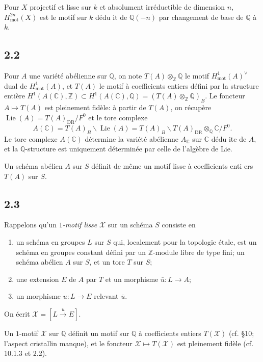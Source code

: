 \documentclass[12pt,a4paper]{article}
\theoremstyle{plain}
\theoremstyle{definition}
\theoremstyle{remark}
\DeclareMathOperator{\Lie}{Lie}
\newcommand{\mot}{\mathrm{mot}}
\providecommand{\mot}{\mathrm{mot}}
\providecommand{\DR}{\mathrm{DR}}
\providecommand{\Lie}{\operatorname{Lie}}
\begin{document}
Pour $X$ projectif et lisse sur $k$ et absolument irr\'eductible de dimension $n$,
$H^{2n}_\mot(X)$ est le motif sur $k$ d\'edu it de $\mathbb{Q}(-n)$ par changement de
base de $\mathbb{Q}$ \`a $k$.

\subsection*{2.2}

Pour $A$ une vari\'et\'e ab\'elienne sur $\mathbb{Q}$, on note $T(A) \otimes_{\mathbb{Z}}
\mathbb{Q}$ le motif $H^1_\mot(A)^\vee$ dual de $H^1_\mot(A)$, et $T(A)$ le motif \`a
coefficients entiers d\'efini par la structure enti\`ere $H^1(A(\mathbb{C}), \mathbb{Z}) \subset
H^1(A(\mathbb{C}), \mathbb{Q}) = (T(A) \otimes_{\mathbb{Z}} \mathbb{Q})_B$. Le foncteur
$A \mapsto T(A)$ est pleinement fid\`ele: \`a partir de $T(A)$, on r\'ecup\`ere
$\Lie(A) = T(A)_{\DR}/F^0$ et le tore complexe
\[
A(\mathbb{C}) = T(A)_B \backslash \Lie(A) = T(A)_B \backslash T(A)_{\DR}
\otimes_{\mathbb{Q}} \mathbb{C}/F^0.
\]
Le tore complexe $A(\mathbb{C})$ d\'etermine la vari\'et\'e ab\'elienne $A_\mathbb{C}$
sur $\mathbb{C}$ d\'edu ite de $A$, et la $\mathbb{Q}$-structure est uniquement d\'etermin\'ee
par celle de l'alg\`ebre de Lie.

Un sch\'ema ab\'elien $A$ sur $S$ d\'efinit de m\^eme un motif lisse \`a coefficients
enti ers $T(A)$ sur $S$.

\subsection*{2.3}

Rappelons qu'un \emph{$1$-motif lisse} $\mathcal{X}$ sur un sch\'ema $S$ consiste en
\begin{enumerate}[label=(\alph*)]
\item un sch\'ema en groupes $L$ sur $S$ qui, localement pour la topologie \'etale, est
un sch\'ema en groupes constant d\'efini par un $\mathbb{Z}$-module libre de type fini; un
sch\'ema ab\'elien $A$ sur $S$, et un tore $T$ sur $S$;
\item une extension $E$ de $A$ par $T$ et un morphisme $\bar{u}: L \to A$;
\item un morphisme $u: L \to E$ relevant $\bar{u}$.
\end{enumerate}
On \'ecrit $\mathcal{X} = [L \xrightarrow{u} E]$.

Un $1$-motif $\mathcal{X}$ sur $\mathbb{Q}$ d\'efinit un motif sur $\mathbb{Q}$ \`a
coefficients entiers $T(\mathcal{X})$ (cf. \cite{D3} \S10; l'aspect cristallin manque), et le
foncteur $\mathcal{X} \mapsto T(\mathcal{X})$ est pleinement fid\`ele (cf. \cite{D3} 10.1.3 et
2.2).
\end{document}
